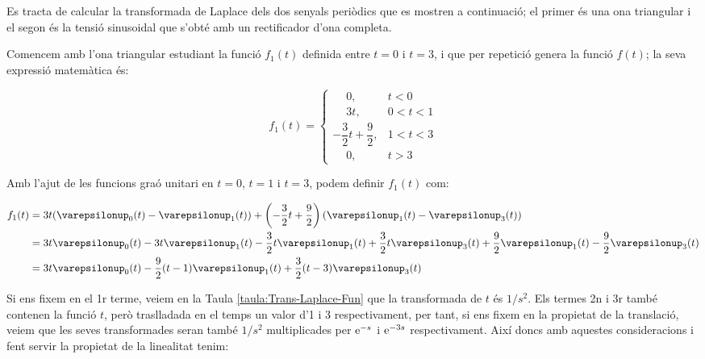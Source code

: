 \begin{exemple}
    Es tracta de calcular la transformada de Laplace dels dos
    senyals periòdics que es mostren a continuació; el primer és una
    ona triangular i el segon és la tensió sinusoidal que s'obté amb un
    rectificador d'ona completa.

    \begin{center}
        
    \end{center}

    Comencem amb l'ona triangular estudiant la funció $f_1(t)$ definida
    entre $t=0$ i $t=3$, i que per repetició genera la funció $f(t)$; la
    seva expressió matemàtica és:

    \[
        f_1(t) = \begin{cases}
        \phantom{-}0, & t < 0\\
        \phantom{-}3t, & 0<t<1 \\
        -\dfrac{3}{2}t +\dfrac{9}{2}, & 1 < t < 3 \\
        \phantom{-}0, & t > 3 \end{cases}
    \]

    Amb l'ajut de les funcions graó unitari en $t=0$, $t=1$ i $t=3$,
    podem definir $f_1(t)$ com:

    \[\begin{split}
        f_1(t) &= 3t (\varepsilonup_0(t) - \varepsilonup_1(t)) + \left(-\frac{3}{2}t
        +\frac{9}{2}\right) (\varepsilonup_1(t) -
        \varepsilonup_3(t))  \\
        &=
        3t\varepsilonup_0(t)-3t\varepsilonup_1(t)-\frac{3}{2}t \varepsilonup_1(t)
        +\frac{3}{2}t \varepsilonup_3(t) +\frac{9}{2} \varepsilonup_1(t)
        -\frac{9}{2} \varepsilonup_3(t)  \\
        &=3t\varepsilonup_0(t) -\frac{9}{2}(t-1)\varepsilonup_1(t) +
        \frac{3}{2}(t-3)\varepsilonup_3(t)
    \end{split}\]

    Si ens fixem en el 1r terme, veiem en la Taula
    \vref{taula:Trans-Laplace-Fun} que la  transformada de $t$ és $1/s^2$.
    Els termes 2n i 3r també contenen la funció $t$, però traslladada
    en el temps un valor d'1 i 3 respectivament, per tant, si ens fixem
    en la propietat de la translació, veiem que les seves transformades
    seran també $1/s^2$ multiplicades per $\mathrm{e}^{-s}$ i $\mathrm{e}^{-3s}$
    respectivament. Així doncs amb aquestes consideracions i fent
    servir la propietat de la linealitat tenim:


\end{exemple}
